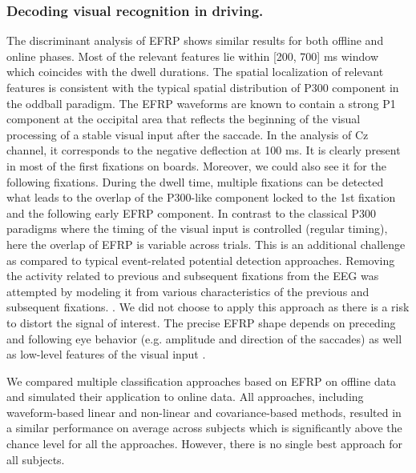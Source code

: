 \documentclass[12pt]{iopart}
\begin{document}
\subsubsection*{Decoding visual recognition in driving.}
The discriminant analysis of EFRP shows similar results for both
offline and online phases. Most of the relevant
features lie within [200, 700] ms window which coincides with the dwell
durations. The spatial localization of relevant features is consistent with the typical
spatial distribution of P300 component in the oddball paradigm.
The EFRP waveforms are known to contain a strong P1 component at the occipital
area that reflects the beginning of the visual processing of a stable visual input
after the saccade. In the analysis of Cz channel, it corresponds to the negative
deflection at 100 ms. It is clearly present in most of the first fixations on boards.
Moreover, we could also see it for the following fixations.
During the dwell time, multiple fixations can be detected 
what leads to the overlap of the P300-like component
locked to the 1st fixation and the following early EFRP component.
In contrast to the classical P300 paradigms where the timing
of the visual input is controlled (regular timing), here the
overlap of EFRP is variable across trials.
This is an additional challenge as compared to typical
event-related potential detection approaches.
Removing the activity related to previous and subsequent fixations
from the EEG was attempted by modeling it from
various characteristics of the previous and subsequent fixations.
\cite{devillez_p300_2015,devillez_eye_2015,kristensen_comparison_2015}.
We did not choose to apply this approach as there is a risk 
to distort the signal of interest.
The precise EFRP shape depends on preceding and following
eye behavior (e.g. amplitude and direction of the saccades)
as well as low-level features of the visual input
\cite{nikolaev_combining_2016}.


We compared multiple classification approaches based on EFRP on offline data and 
simulated their application to online data.
All approaches, including waveform-based linear and non-linear and covariance-based 
methods, resulted in a similar performance on average across subjects
which is significantly above the chance level for all the approaches.
However, there is no single best approach for all subjects.
\end{document}
